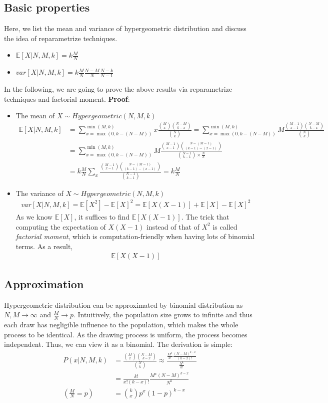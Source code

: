 \documentclass[../Distributions.tex]{subfiles}
\begin{document}
\subsection{Basic properties}
Here, we list the mean and variance of hypergeometric distribution and discuss the idea of reparametrize techniques.
\begin{itemize}
	\item $\mathbb{E}[X|N,M,k] = k\frac{M}{N}$
	\item $var[X|N,M,k]=k\frac{M}{N}\frac{N-M}{N}\frac{N-k}{N-1}$
\end{itemize}
In the following, we are going to prove the above results via reparametrize techniques and factorial moment.
{\bf Proof}:
\begin{itemize}
	\item The mean of $X\sim\textit{Hypergeometric}(N,M,k)$
	\begin{align*}
	\mathbb{E}[X|N,M,k] &= \sum_{x=\max(0,k-(N-M))}^{\min(M,k)} x \frac{{M\choose x}{N-M \choose k-x}}{{N\choose k}}= \sum_{x=\max(0,k-(N-M))}^{\min(M,k)} M \frac{{M-1\choose x-1}{N-M \choose k-x}}{{N\choose k}}\\
	&= \sum_{x=\max(0,k-(N-M))}^{\min(M,k)} M \frac{{M-1\choose x-1}{N-(M-1) \choose (k-1)-(x-1)}}{{N-1\choose k-1}\times\frac{N}{k}}\\
	&=k\frac{M}{N}\sum_{x}\frac{{M-1\choose x-1}{N-(M-1) \choose (k-1)-(x-1)}}{{N-1\choose k-1}}=k\frac{M}{N}
	\end{align*}
	\item The variance of $X\sim\textit{Hypergeometric}(N,M,k)$
	\begin{align*}
	var[X|N,M,k] = \mathbb{E}[X^2]-\mathbb{E}[X]^2 = \mathbb{E}[X(X-1)] + \mathbb{E}[X] - \mathbb{E}[X]^2
	\end{align*}
	As we know $\mathbb{E}[X]$, it suffices to find $\mathbb{E}[X(X-1)]$. The trick that computing the expectation of $X(X-1)$ instead of that of $X^2$ is called {\it factorial moment}, which is computation-friendly when having lots of binomial terms. As a result,
	\begin{align*}
	\mathbb{E}[X(X-1)] 
	\end{align*}
\end{itemize}

\subsection{Approximation}
Hypergeometric distribution can be approximated by binomial distribution as $N,M\rightarrow\infty$ and $\frac{M}{N}\rightarrow p$. Intuitively, the population size grows to infinite and thus each draw has negligible influence to the population, which makes the whole process to be identical. As the drawing process is uniform, the process becomes independent. Thus, we can view it as a binomial. The derivation is simple:
\begin{align*}
P(x|N,M,k) &= \frac{{M\choose x}{N-M \choose k-x}}{{N\choose k}} \approx \frac{\frac{M^x}{x!}\frac{(N-M)^{k-x}}{(k-x)!}}{\frac{N^k}{k!}}\\
&=\frac{k!}{x!(k-x)!}\frac{M^x(N-M)^{k-x}}{N^k}\\
(\frac{M}{N}=p)&={k\choose x}p^x(1-p)^{k-x}
\end{align*}
\end{document}
